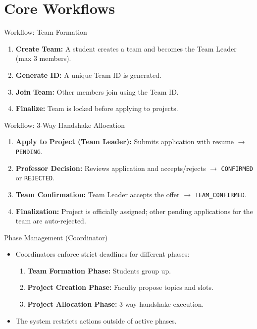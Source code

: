 \documentclass[aspectratio=169]{beamer}
\begin{document}
\section{Core Workflows}

\begin{frame}{Workflow: Team Formation}
    \begin{enumerate}
        \item \textbf{Create Team:} A student creates a team and becomes the Team Leader (max 3 members).
        \item \textbf{Generate ID:} A unique Team ID is generated.
        \item \textbf{Join Team:} Other members join using the Team ID.
        \item \textbf{Finalize:} Team is locked before applying to projects.
    \end{enumerate}
\end{frame}

\begin{frame}{Workflow: 3-Way Handshake Allocation}
    \begin{enumerate}
        \item \textbf{Apply to Project (Team Leader):} Submits application with resume $\rightarrow$ \texttt{PENDING}.
        \item \textbf{Professor Decision:} Reviews application and accepts/rejects $\rightarrow$ \texttt{CONFIRMED} or \texttt{REJECTED}.
        \item \textbf{Team Confirmation:} Team Leader accepts the offer $\rightarrow$ \texttt{TEAM\_CONFIRMED}.
        \item \textbf{Finalization:} Project is officially assigned; other pending applications for the team are auto-rejected.
    \end{enumerate}
\end{frame}

\begin{frame}{Phase Management (Coordinator)}
    \begin{itemize}
        \item Coordinators enforce strict deadlines for different phases:
        \begin{enumerate}
            \item \textbf{Team Formation Phase:} Students group up.
            \item \textbf{Project Creation Phase:} Faculty propose topics and slots.
            \item \textbf{Project Allocation Phase:} 3-way handshake execution.
        \end{enumerate}
        \item The system restricts actions outside of active phases.
    \end{itemize}
\end{frame}
\end{document}
